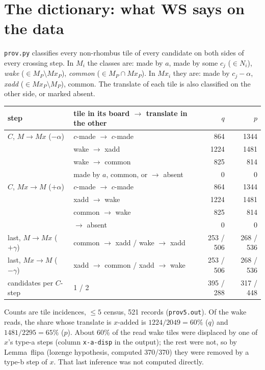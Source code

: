 \documentclass[11pt]{article}
\theoremstyle{definition}\newtheorem{definition}[theorem]{Definition}\newtheorem{remark}[theorem]{Remark}
\begin{document}
\section{The dictionary: what WS says on the data}\label{sec:dict}
\texttt{prov.py} classifies every non-rhombus tile of every candidate on both sides of every crossing step. In $M_i$ the classes are: made by $a$, made by some $c_j$ ($\in N_i$), \emph{wake} ($\in M_P\setminus Mx_P$), \emph{common} ($\in M_P\cap Mx_P$).
In $Mx_i$ they are: made by $c_j-\alpha$, \emph{xadd} ($\in Mx_P\setminus M_P$), common. The translate of each tile is also classified on the other side, or marked absent.
\begin{center}\begin{tabular}{llrr}\toprule
step & tile in its board $\to$ translate in the other & $q$ & $p$\\\midrule
$C$, $M\to Mx$ ($-\alpha$) & $c$-made $\to$ $c$-made & 864 & 1344\\
& wake $\to$ xadd & 1224 & 1481\\
& wake $\to$ common & 825 & 814\\
& made by $a$, common, or $\to$ absent & 0 & 0\\
$C$, $Mx\to M$ ($+\alpha$) & $c$-made $\to$ $c$-made & 864 & 1344\\
& xadd $\to$ wake & 1224 & 1481\\
& common $\to$ wake & 825 & 814\\
& $\to$ absent & 0 & 0\\
last, $M\to Mx$ ($+\gamma$) & common $\to$ xadd / wake $\to$ xadd & 253 / 506 & 268 / 536\\
last, $Mx\to M$ ($-\gamma$) & xadd $\to$ common / xadd $\to$ wake & 253 / 506 & 268 / 536\\\midrule
candidates per $C$-step & 1 / 2 & 395 / 288 & 317 / 448\\\bottomrule
\end{tabular}\end{center}
Counts are tile incidences, $\le5$ census, 521 records (\texttt{prov5.out}). Of the wake reads, the share whose translate is $x$-added is $1224/2049=60\%$ ($q$) and $1481/2295=65\%$ ($p$).
About 60\% of the read wake tiles were displaced by one of $x$'s type-a steps (column \texttt{x-a-disp} in the output); the rest were not, so by Lemma~flipa (lozenge hypothesis, computed 370/370) they were removed by a type-b step of $x$. That last inference was not computed directly.
\end{document}
